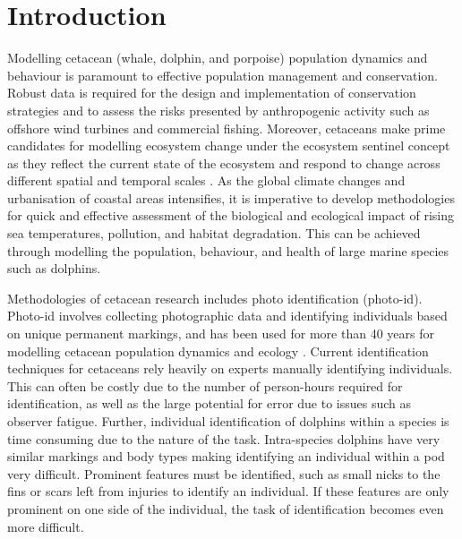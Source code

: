 \chapter{Introduction}

Modelling cetacean (whale, dolphin, and porpoise) population dynamics and behaviour is paramount to effective population management and conservation. Robust data is required for the design and implementation of conservation strategies and to assess the risks presented by anthropogenic activity such as offshore wind turbines and commercial fishing. Moreover, cetaceans make prime candidates for modelling ecosystem change under the ecosystem sentinel concept as they reflect the current state of the ecosystem and respond to change across different spatial and temporal scales \cite{moore_marine_2008}. As the global climate changes and urbanisation of coastal areas intensifies, it is imperative to develop methodologies for quick and effective assessment of the biological and ecological impact of rising sea temperatures, pollution, and habitat degradation. This can be achieved through modelling the population, behaviour, and health of large marine species such as dolphins.

Methodologies of cetacean research includes photo identification (photo-id). Photo-id involves collecting photographic data and identifying individuals based on unique permanent markings, and has been used for more than 40 years for modelling cetacean population dynamics and ecology \cite{connor_male_2015, wursig_photographic_1977}. Current identification techniques for cetaceans rely heavily on experts manually identifying individuals. This can often be costly due to the number of person-hours required for identification, as well as the large potential for error due to issues such as observer fatigue. Further, individual identification of dolphins within a species is time consuming due to the nature of the task. Intra-species dolphins have very similar markings and body types making identifying an individual within a pod very difficult. Prominent features must be identified, such as small nicks to the fins or scars left from injuries to identify an individual. If these features are only prominent on one side of the individual, the task of identification becomes even more difficult.

